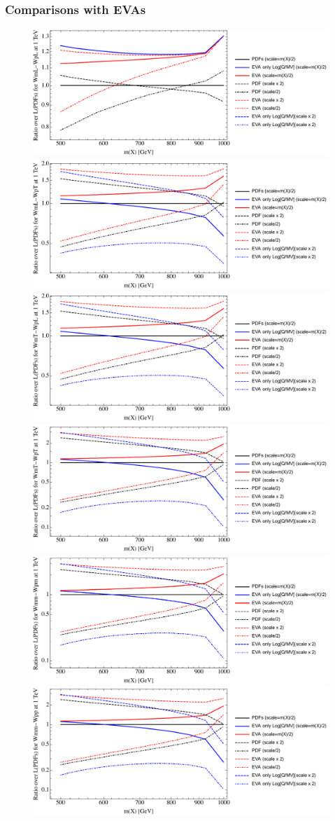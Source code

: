 \documentclass[a4paper,11pt]{article}
\begin{document}
\clearpage
\subsubsection{Comparisons with EVAs}


\begin{figure}[ht]
\includegraphics[width=0.46\linewidth]{Notebooks/PlotLumi/1TeV/ratios/WmL-WpL.pdf}
\includegraphics[width=0.46\linewidth]{Notebooks/PlotLumi/1TeV/ratios/WmL-WpT.pdf}
\includegraphics[width=0.46\linewidth]{Notebooks/PlotLumi/1TeV/ratios/WmT-WpL.pdf}
\includegraphics[width=0.46\linewidth]{Notebooks/PlotLumi/1TeV/ratios/WmT-WpT.pdf}
\includegraphics[width=0.46\linewidth]{Notebooks/PlotLumi/1TeV/ratios/Wmm-Wpm.pdf}
\includegraphics[width=0.46\linewidth]{Notebooks/PlotLumi/1TeV/ratios/Wmm-Wpp.pdf}
\end{figure}
\end{document}
